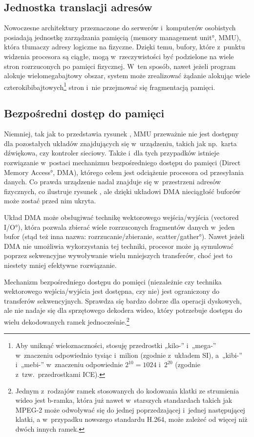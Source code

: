 \subsection{Jednostka translacji adresów}

Nowoczesne architektury przeznaczone do serwerów i~komputerów
osobistych posiadają jednostkę zarządzania pamięcią (\ang{memory
  management unit}, MMU), która tłumaczy adresy logiczne na fizyczne.
Dzięki temu, bufory, które z~punktu widzenia procesora są ciągłe, mogą
w~rzeczywistości być podzielone na wiele stron rozrzuconych po pamięci
fizycznej.  W~ten sposób, nawet jeżeli program alokuje
wielomegabajtowy obszar, system może zrealizować żądanie alokując
wiele czterokibibajtowych\footnote{Aby uniknąć wieloznaczności,
  stosuję przedrostki „kilo-” i~„mega-” w~znaczeniu odpowiednio tysiąc
  i~milion (zgodnie z~układem SI), a~„kibi-” i~„mebi-” w~znaczeniu
  odpowiednie $2^{10} = 1024$ i~$2^{20}$ (zgodnie
  z~tzw.\ przedrostkami ICE).} stron i~nie przejmować się fragmentacją
pamięci.

\subsection{Bezpośredni dostęp do pamięci}

Niemniej, tak jak to przedstawia rysunek ,
MMU przeważnie nie jest dostępny dla pozostałych układów znajdujących
się w~urządzeniu, takich jak np.\ karta dźwiękowa, czy kontroler
sieciowy.  Także i~dla tych przypadków istnieje rozwiązanie w~postaci
mechanizmu bezpośredniego dostępu do pamięci (\ang{Direct Memory
  Access}, DMA), którego celem jest odciążenie procesora od
przesyłania danych.  Co prawda urządzenie nadal znajduje się
w~przestrzeni adresów fizycznych, co ilustruje rysunek
, ale dzięki układowi DMA nieciągłość
buforów może zostać przed nim ukryta.

Układ DMA może obsługiwać technikę wektorowego wejścia/wyjścia
(\ang{vectored I/O}), która pozwala zbierać wiele rozrzuconych
fragmentów danych w~jeden bufor (stąd też inna nazwa:
rozrzucanie/zbieranie, \ang{scatter/gather}).  Nawet jeżeli DMA nie
umożliwia wykorzystania tej techniki, procesor może ją symulować
poprzez sekwencyjne wywoływanie wielu mniejszych transferów, choć jest
to niestety mniej efektywne rozwiązanie.

Mechanizm bezpośredniego dostępu do pomięci (niezależnie czy technika
wektorowego wejścia/wyjścia jest dostępna, czy nie) jest ograniczony
do transferów sekwencyjnych.  Sprawdza się bardzo dobrze dla operacji
dyskowych, ale nie nadaje się dla sprzętowego dekodera wideo, który
potrzebuje dostępu do wielu dekodowanych ramek
jednocześnie.\footnote{Jednym z~rodzajów ramek stosowanych do
  kodowania klatki ze strumienia wideo jest b-ramka, która już nawet
  w~starszych standardach takich jak MPEG-2 może odwoływać się do
  jednej poprzedzającej i~jednej następującej klatki, a w~przypadku
  nowszego standardu H.264, może zależeć od więcej niż dwóch innych
  ramek.}

